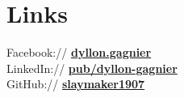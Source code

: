 \documentclass[letterpaper]{deedy-resume} %
\begin{document}
\begin{minipage}[t]{0.35\textwidth}
\sectionspace %


\section{Links}

Facebook:// \href{https://www.facebook.com/dyllon.gagnier}{\bf dyllon.gagnier} \\
LinkedIn:// \href{http://www.linkedin.com/pub/dyllon-gagnier/2a/6b3/808/}{\bf pub/dyllon-gagnier} \\
GitHub:// \href{https://github.com/}{\bf slaymaker1907} \\

\sectionspace %


\end{minipage} %
\hfill
%
%
\end{document}
